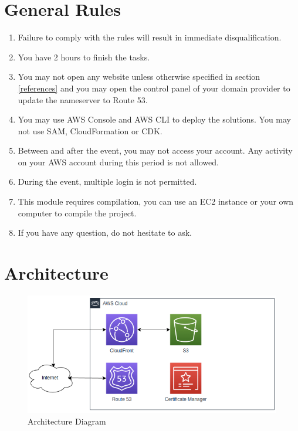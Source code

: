 \documentclass{article}
\begin{document}
\section{General Rules}
\begin{enumerate}
    \item Failure to comply with the rules will result in immediate disqualification.
    \item You have 2 hours to finish the tasks.
    \item You may not open any website unless otherwise specified in section \ref{references} and you may open the control panel of your domain provider to update the nameserver to Route 53.
    \item You may use AWS Console and AWS CLI to deploy the solutions. You may not use SAM, CloudFormation or CDK.
    \item Between and after the event, you may not access your account. Any activity on your AWS account during this period is not allowed.
    \item During the event, multiple login is not permitted.
    \item This module requires compilation, you can use an EC2 instance or your own computer to compile the project.
    \item If you have any question, do not hesitate to ask.
\end{enumerate}
\section{Architecture}
\begin{figure}[h]
\centering
\includegraphics[width=\textwidth]{modul2_architecture.png}
\caption{\label{fig:architecture}Architecture Diagram}
\end{figure}
\end{document}
